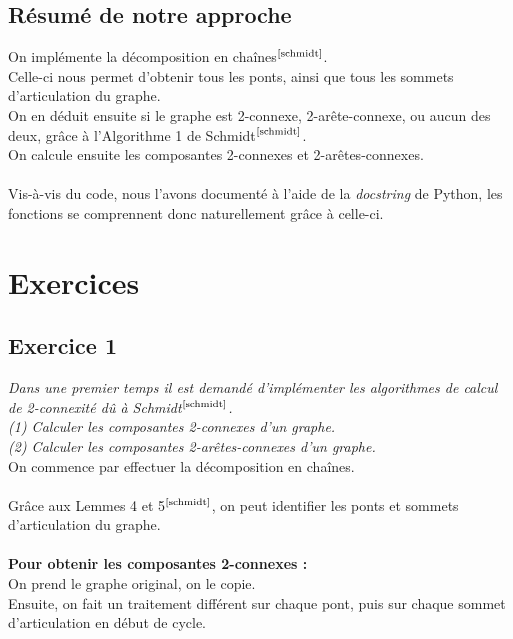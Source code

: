 \documentclass{article}      %
\begin{document}
\subsection{Résumé de notre approche}
On implémente la décomposition en chaînes$^\text{\cite{schmidt}}$.
\\Celle-ci nous permet d'obtenir tous les ponts, ainsi que tous les sommets d'articulation du graphe.
\\On en déduit ensuite si le graphe est 2-connexe, 2-arête-connexe, ou aucun des deux, grâce à l'Algorithme 1 de Schmidt$^\text{\cite{schmidt}}$.
\\On calcule ensuite les composantes 2-connexes et 2-arêtes-connexes.
\\\\Vis-à-vis du code, nous l'avons documenté à l'aide de la \textit{docstring} de Python, les fonctions se comprennent donc naturellement grâce à celle-ci.
%


\section{Exercices}
\subsection{Exercice 1}
\textit{\textcolor{exogris}{
Dans une premier temps il est demandé d’implémenter les algorithmes de calcul de 2-connexité dû à Schmidt$^\text{\cite{schmidt}}$.
\\(1) Calculer les composantes 2-connexes d’un graphe.
\\(2) Calculer les composantes 2-arêtes-connexes d’un graphe.
}}
\\On commence par effectuer la décomposition en chaînes.
\\\\Grâce aux Lemmes 4 et 5$^\text{\cite{schmidt}}$, on peut identifier les ponts et sommets d'articulation du graphe.
\\\\\textbf{Pour obtenir les composantes 2-connexes :}
\\On prend le graphe original, on le copie.
\\Ensuite, on fait un traitement différent sur chaque pont, puis sur chaque sommet d'articulation en début de cycle.
\end{document}
